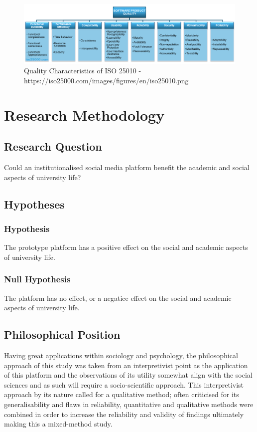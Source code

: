 \documentclass[lettersize,journal]{IEEEtran}
\begin{document}
        \begin{figure}[h!]
                \includegraphics[width=\linewidth]{images/iso.png}
                \caption{Quality Characteristics of ISO 25010 - https://iso25000.com/images/figures/en/iso25010.png}
                \label{figure 2}
        \end{figure}





\section{Research Methodology}

	\subsection{Research Question}
		Could an institutionalised social media platform benefit the academic and social aspects of university life?

	\subsection{Hypotheses}
		\subsubsection{Hypothesis}
		The prototype platform has a positive effect on the social and academic aspects of university life.
\\
		\subsubsection{Null Hypothesis}
		The platform has no effect, or a negatice effect on the social and academic aspects of university life.


        \subsection{Philosophical Position}
        Having great applications within sociology and psychology, the philosophical approach of this study was taken from an 
        interpretivist point as the application of this platform and the observations of its utility somewhat align with the social
         sciences and as such will require a socio-scientific approach. This interpretivist approach by its nature called for a qualitative
         method; often criticised for its generalisability and flaws in reliability, quantitative and qualitative methods were combined
         in order to increase the reliability and validity of findings ultimately making this a mixed-method study.
\end{document}
